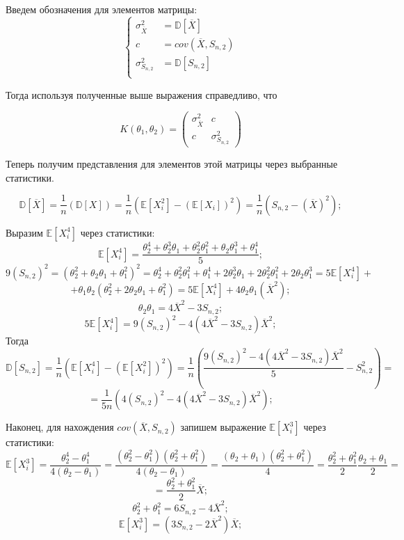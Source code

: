 \documentclass{article}
\begin{document}
Введем обозначения для элементов матрицы:
\begin{equation*}
	\begin{cases}
		\sigma^2_{\overline{X}} &= \textbf{$\mathbb{D}[\overline{X}]$}\\
		c & = cov\left(\overline{X}, S_{n, 2}\right) \\
		\sigma^2_{S_{n, 2}} &= \textbf{$\mathbb{D}[S_{n, 2}]$}\\
	\end{cases}
\end{equation*}

Тогда используя полученные выше выражения справедливо, что 

\[
K(\theta_1, \theta_2) = 
\begin{pmatrix}
	\sigma^2_{\overline{X}} & c\\
	c & \sigma^2_{S_{n, 2}}
\end{pmatrix}\]

Теперь получим представления для элементов этой матрицы через выбранные статистики.

\[\textbf{$\mathbb{D}\left[\overline{X}\right]$} = \frac{1}{n}\left(\textbf{$\mathbb{D}[X]$}\right) = \frac{1}{n}(\mathbb{E}\left[X_i^2\right]-\left(\mathbb{E}[X_i]\right)^2) = \frac{1}{n}\left(S_{n, 2} - \left(\overline{X}\right)^2\right);\]

Выразим $\mathbb{E}\left[X_i^4\right]$ через статистики:
\[\mathbb{E}\left[X_i^4\right] = \frac{\theta_2^4+\theta_2^3\theta_1+\theta_2^2\theta_1^2+\theta_2\theta_1^3+\theta_1^4}{5};\]
\[9(S_{n, 2})^2 = (\theta_2^2+\theta_2\theta_1+\theta_1^2)^2 = \theta_2^4+\theta_2^2\theta_1^2+\theta_1^4 + 2\theta_2^3\theta_1+2\theta_2^2\theta_1^2+2\theta_2\theta_1^3 = 5\mathbb{E}\left[X_i^4\right] + \]
\[+\theta_1\theta_2(\theta_2^2+2\theta_2\theta_1+\theta_1^2) = 5\mathbb{E}\left[X_i^4\right] + 4\theta_2\theta_1\left(\overline{X}^2\right);\]
\[\theta_2\theta_1 = 4\overline{X}^2-3S_{n, 2};\]
\[5\mathbb{E}\left[X_i^4\right] = 9(S_{n, 2})^2 - 4(4\overline{X}^2-3S_{n, 2})\overline{X}^2;\]
Тогда 
\[\mathbb{D}[S_{n, 2}] = \frac{1}{n}\left(\mathbb{E}\left[X_i^4\right]- \left(\mathbb{E}[X_i^2]\right)^2\right) = \frac{1}{n}\left(\frac{9(S_{n, 2})^2 - 4(4\overline{X}^2-3S_{n, 2})\overline{X}^2}{5} - S_{n, 2}^2\right) = \]
\[ = \frac{1}{5n}\left(4(S_{n, 2})^2 - 4(4\overline{X}^2-3S_{n, 2})\overline{X}^2\right);\]

Наконец, для нахождения $cov\left(\overline{X}, S_{n, 2}\right)$ запишем выражение $\mathbb{E}\left[X_i^3\right]$ через статистики:
\[\mathbb{E}\left[X_i^3\right] = \frac{\theta_2^4-\theta_1^4}{4(\theta_2-\theta_1)}=\frac{(\theta_2^2-\theta_1^2)(\theta_2^2+\theta_1^2)}{4(\theta_2-\theta_1)} = \frac{(\theta_2+\theta_1)(\theta_2^2+\theta_1^2)}{4} = \frac{\theta_2^2+\theta_1^2}{2}\frac{\theta_2+\theta_1}{2}=\]
\[=\frac{\theta_2^2+\theta_1^2}{2}\overline{X};\]
\[\theta_2^2+\theta_1^2 = 6S_{n,2}-4\overline{X}^2;\]
\[\mathbb{E}\left[X_i^3\right] = \left(3S_{n, 2}-2\overline{X}^2\right)\overline{X};\]
\end{document}
